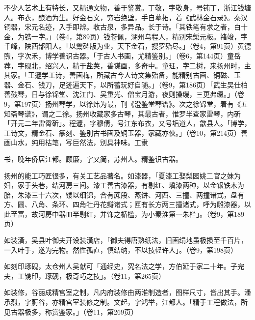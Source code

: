 不少人艺术上有特长，又精通文物，善于鉴赏。丁敬，字敬身，号钝丁，浙江钱塘人。布衣，酿酒为生。好金石文，穷岩绝壁，手自摹拓，着《武林金石录》。秦汉铜器，宋元名迹，入手即辨。收古泉，多异品。长于诗。「其铁笔有求之者，白十金，为镌一字。」（卷4，第89页）钱苍佩，湖州乌程人，精别宋椠元板。褚竣，字千峰，陕西邰阳人。「以鬻碑版为业，天下金石，搜罗殆尽。」（卷4，第91页）黄德煦，字次禾，博学善识古器。「于古人书画，尤精鉴别。」（卷6，第144页）童岳荐，字砚北，绍兴人，精于盐荚，善谋画，多奇中。童玨，字二树，来扬州时，主其家。「王邃学工诗，善画梅，所藏古今人诗文集殆备，能精别古画、铜磁、玉器、金石、钱刀，足迹遍天下，以所蓄玩好自随。」（卷9，第186页）「武生吴仕柏善鼓琴，日与徐锦堂、沈江门、吴重光、僧宝月游，夜则操缦，三更弗缀。」（卷9，第197页）扬州琴学，以徐炜为最，刊《澄鉴堂琴谱》。次之徐锦堂，着有《五知斋琴谱》，谓之二徐。扬州收藏家多古琴，其最古者，惟罗半查家雷琴，内斫「开元二年雷霄斫」。程邃，字穆倩，号江东布衣，又号垢道人，歙县人。「博学，工诗文，精金石、篆刻、鉴别古书画及铜玉器，家藏亦伙。」（卷10，第214页）善画山水，纯用枯笔，写巨然法，别具神味。工隶

\vfill
\begin{BookNotes}
\end{BookNotes}

\noindent 书，晚年侨居江都。顾廉，字又简，苏州人。精鉴识古器。

扬州的能工巧匠很多，有关工艺品著名。如漆器，「夏漆工娶梨园姚二官之妹为妇，家于头巷，结河房三间。漆工善古漆器，有剔红、塡漆两种，以金银铁木为胎，朱漆三十六次，镂以细锦，合有蔗段、蒸饼、河西、三撞、两撞诸式，盘有方、圆、八角、条环、四角牡丹花瓣诸式；匣有长方两三撞诸式，呼为雕漆器，以此至富，故河房中器皿半剔红，并饰之楯槛，为小秦淮第一朱栏」。（卷9，第189页）

如装潢，吴县叶御夫开设装潢店，「御夫得唐熟纸法，旧画绢地虽极损至千百片，一入叶手，遂为完物。然性孤直，慎结纳，不以技轻许人」。（卷9，第198页）

如刻印琢砚，太仓州人吴献可「通经史，究名法之学，方伯延于家二十年。子完夫，工镌印，琢砚，极奇巧之技」。（卷11，第265页）

如装修，谷丽成精宫室之制，凡内府装修由两淮制造者，图样尺寸，皆出其手。潘承烈，字蔚谷，亦精宫室装修之制。文起，字鸿举，江都人。「精于工程做法，所见古器极多，称赏鉴家。」（卷11，第269页）


